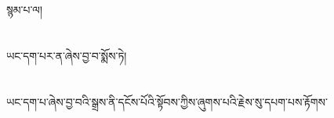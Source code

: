 སྙམ་པ་ལ།\chapter{ }ཡང་དག་པར་ན་ཞེས་བྱ་བ་སྨོས་ཏེ།\chapter{ }ཡང་དག་པ་ཞེས་བྱ་བའི་སྒྲས་ནི་དངོས་པོའི་སྟོབས་ཀྱིས་ཞུགས་པའི་རྗེས་སུ་དཔག་པས་རྟོགས་